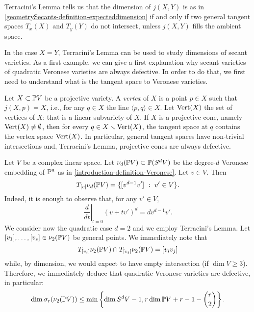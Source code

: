 \begin{remark}
\label{geometrySecants-remark-terracini}
    Terracini's Lemma tells us that the dimension of $j(X,Y)$ is as in \ref{geometrySecants-definition-expecteddimension} if and only if two general tangent spaces $T_x(X)$ and $T_y(Y)$ do not intersect, unless $j(X,Y)$ fills the ambient space. 
\end{remark}

In the case $X = Y$, Terracini's Lemma can be used to study dimensions of secant varieties. As a first example, we can give a first explanation why secant varieties of quadratic Veronese varieties are always defective. In order to do that, we first need to understand what is the tangent space to Veronese varieties. 


\begin{example}
\label{geometrySecants-lemma-cones_defective}
    Let $X \subset \mathbb{P} V$ be a projective variety. A {\it vertex} of $X$ is a point $p \in X$ such that $j(X,p) = X$, i.e., for any $q \in X$ the line $\langle p,q \rangle \in X$. Let ${\rm Vert}(X)$ the set of vertices of $X$: that is a linear subvariety of $X$. If $X$ is a projective cone, namely ${\rm Vert}(X) \neq \emptyset$, then for every $q \in X \smallsetminus {\rm Vert}(X)$, the tangent space at $q$ contains the vertex space ${\rm Vert}(X)$. In particular, general tangent spaces have non-trivial intersections and, Terracini's Lemma, projective cones are always defective. 
\end{example}

\begin{example}
\label{geometrySecants-lemma-quadratic_Veronese_defective}
    Let $V$ be a complex linear space. Let $\nu_d(\mathbb{P} V) \subset \mathbb{P}(S^d V)$ be the degree-$d$ Veronese embedding of $\mathbb{P}^n$ as in \ref{introduction-definition-Veronese}. Let $v \in V$. Then
    \[
        T_{[v]}\nu_d(\mathbb{P} V) = \{[v^{d-1}v'] ~:~ v' \in V\}. 
    \]
    Indeed, it is enough to observe that, for any $v' \in V$,
    \[
        \left.\frac{d}{dt}\right|_{t = 0}(v+tv')^{d} = dv^{d-1}v'.
    \]
    We consider now the quadratic case $d = 2$ and we employ Terracini's Lemma. Let $[v_1],\ldots,[v_s] \in \nu_2(\mathbb{P} V)$ be general points. We immediately note that 
    \[
        T_{[v_i]}\nu_2(\mathbb{P} V) \cap T_{[v_j]}\nu_2(\mathbb{P} V) = [v_iv_j]
    \]
    while, by dimension, we would expect to have empty intersection (if $\dim V \geq 3$). Therefore, we immediately deduce that quadratic Veronese varieties are defective, in particular:
    \[
        \dim \sigma_r(\nu_2(\mathbb{P} V)) \leq \min \left\{\dim S^dV - 1, r\dim \mathbb{P} V + r - 1 - {r \choose 2}\right\}.  
    \]
\end{example}

